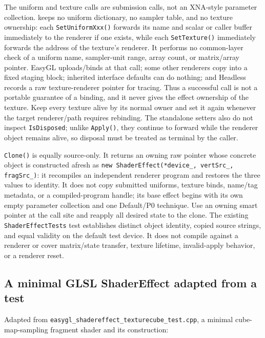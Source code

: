 The uniform and texture calls are submission calls, not an XNA-style parameter collection.
 keeps no uniform dictionary, no sampler table, and no texture ownership:
each \texttt{SetUniformXxx()} forwards its name and scalar or caller buffer immediately to the
renderer if one exists, while each \texttt{SetTexture()} immediately forwards the address of the
texture's renderer. It performs no common-layer check of a uniform name, sampler-unit range,
array count, or matrix/array pointer. EasyGL uploads/binds at that call; some other renderers copy
into a fixed staging block; inherited interface defaults can do nothing; and Headless records a
raw texture-renderer pointer for tracing. Thus a successful call is not a portable guarantee of a
binding, and it never gives the effect ownership of the texture. Keep every texture alive by its
normal owner and set it again whenever the target renderer/path requires rebinding. The standalone
setters also do not inspect \texttt{IsDisposed}; unlike \texttt{Apply()}, they continue to
forward while the renderer object remains alive, so disposal must be treated as terminal by the
caller.

\texttt{Clone()} is equally source-only. It returns an owning raw  pointer
whose concrete object is constructed afresh as
\texttt{new ShaderEffect(*device\_, vertSrc\_, fragSrc\_)}: it recompiles an independent
renderer program and restores the three  values to identity. It does
not copy submitted uniforms, texture binds, name/tag metadata, or a compiled-program handle;
its base effect begins with its own empty parameter collection and one Default/P0 technique.
Use an owning smart pointer at the call site and reapply all desired state to the clone. The
existing \texttt{ShaderEffectTests} test establishes distinct object identity, copied source
strings, and equal validity on the default test device. It does not compile against a renderer or
cover matrix/state transfer, texture lifetime, invalid-apply behavior, or a renderer reset.

\subsection{A minimal GLSL ShaderEffect adapted from a test}

Adapted from \texttt{easygl\_shadereffect\_texturecube\_test.cpp}, a minimal
cube-map-sampling fragment shader and its construction:

